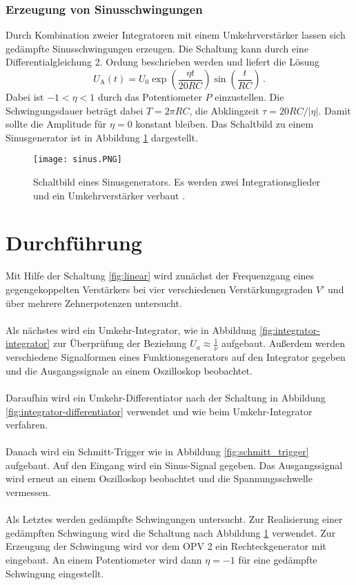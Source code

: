 \documentclass[
  bibliography=totoc,     %
  captions=tableheading,  %
  titlepage=firstiscover, %
]{scrartcl}
\begin{document}
\subsubsection{Erzeugung von Sinusschwingungen}
\label{subsubsec:sinusschwingungen}
Durch Kombination zweier Integratoren mit einem Umkehrverstärker lassen sich
gedämpfte Sinusschwingungen erzeugen.
Die Schaltung kann durch eine Differentialgleichung 2. Ordung beschrieben
werden und liefert die Lösung
\begin{equation}
    U_\text{A}(t) = U_0 \exp\!\left( \frac{\eta t}{\num{20} RC} \right)
                        \sin\!\left( \frac{t}{RC} \right)\,.
    \label{eqn:oszi}
\end{equation}
Dabei ist $\num{-1} < \eta < \num{1}$ durch das Potentiometer $P$ einzustellen.
Die Schwingungsdauer beträgt dabei $T = 2\pi RC$, die Abklingzeit
$\tau = 20 RC / |\eta|$. Damit sollte die Amplitude für $\eta = \num{0}$
konstant bleiben.
Das Schaltbild zu einem Sinusgenerator ist in Abbildung \ref{fig:sinus}
dargestellt.
\begin{figure}[H]
    \centering
    \texttt{[image: sinus.PNG]}
    \caption{
        Schaltbild eines Sinusgenerators. Es werden zwei Integrationsglieder
        und ein Umkehrverstärker verbaut \cite{V51}.
    }
    \label{fig:sinus}
\end{figure}

\section{Durchführung}
\label{sec:durchführung}


Mit Hilfe der Schaltung \ref{fig:linear} wird zunächst der Frequenzgang eines
gegengekoppelten Verstärkers bei vier verschiedenen Verstärkungsgraden $V'$
und über mehrere Zehnerpotenzen untersucht. \\
\\
\noindent
Als nächstes wird ein Umkehr-Integrator, wie in Abbildung
\ref{fig:integrator-integrator} zur Überprüfung der Beziehung
$U_a \approx \frac{1}{\nu}$ aufgebaut. Außerdem werden
verschiedene Signalformen eines Funktionsgenerators auf den Integrator gegeben und
die Ausgangssignale an einem Oszilloskop beobachtet. \\
\\
\noindent
Daraufhin wird ein Umkehr-Differentiator nach der Schaltung in Abbildung
\ref{fig:integrator-differentiator} verwendet und wie beim Umkehr-Integrator
verfahren. \\
\\
\noindent
Danach wird ein Schmitt-Trigger wie in Abbildung \ref{fig:schmitt_trigger} aufgebaut.
Auf den Eingang wird ein Sinus-Signal gegeben. Das Ausgangssignal wird erneut an einem
Oszilloskop beobachtet und die Spannungsschwelle vermessen. \\
\\
\noindent
Als Letztes werden gedämpfte Schwingungen untersucht. Zur Realisierung einer gedämpften
Schwingung wird die Schaltung nach Abbildung \ref{fig:sinus} verwendet. Zur Erzeugung
der Schwingung wird vor dem OPV 2 ein Rechteckgenerator mit eingebaut. An einem
Potentiometer wird dann $\eta = -1$ für eine gedämpfte Schwingung eingestellt.
\clearpage
\end{document}
